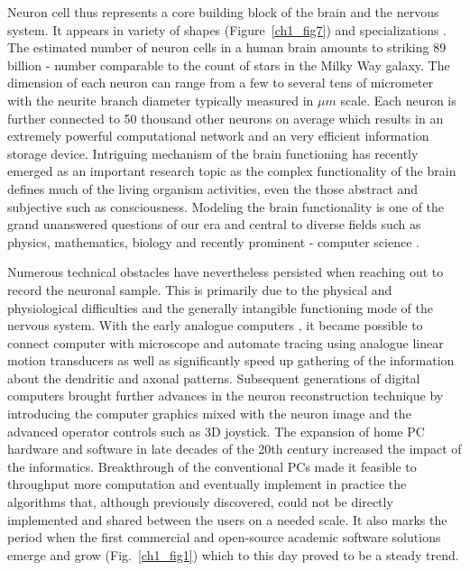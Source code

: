 Neuron cell thus represents a core building block of the brain and the nervous system. It appears in variety of shapes (Figure~\ref{ch1_fig7}) and specializations \cite{ascolitrees}. The estimated number of neuron cells in a human brain amounts to striking 89 billion \cite{herculano2009human} - number comparable to the count of stars in the Milky Way galaxy. The dimension of each neuron can range from a few to several tens of micrometer with the neurite branch diameter typically measured in $\mu m$ scale. Each neuron is further connected to 50 thousand other neurons on average which results in an extremely powerful computational network and an very efficient information storage device. Intriguing mechanism of the brain functioning has recently emerged as an important research topic as the complex functionality of the brain defines much of the living organism activities, even the those abstract and subjective such as consciousness. Modeling the brain functionality is one of the grand unanswered questions of our era and central to diverse fields such as physics, mathematics, biology and recently prominent - computer science \cite{markram2015reconstruction}.

Numerous technical obstacles have nevertheless persisted when reaching out to record the neuronal sample. This is primarily due to the physical and physiological difficulties and the generally intangible functioning mode of the nervous system. With the early analogue computers \cite{glaser1965semi}, it became possible to connect computer with microscope and automate tracing using analogue linear motion transducers as well as significantly speed up gathering of the information about the dendritic and axonal patterns. Subsequent generations of digital computers \cite{capowski1981accurate,capowski1977computer} brought further advances in the neuron reconstruction technique by introducing the computer graphics mixed with the neuron image and the advanced operator controls such as 3D joystick. The expansion of home PC hardware and software in late decades of the 20th century increased the impact of the informatics. Breakthrough of the conventional PCs made it feasible to throughput more computation and eventually implement in practice the algorithms that, although previously discovered, could not be directly implemented and shared between the users on a needed scale. It also marks the period when the first commercial and open-source academic software solutions emerge and grow (Fig.~\ref{ch1_fig1}) which to this day proved to be a steady trend.

